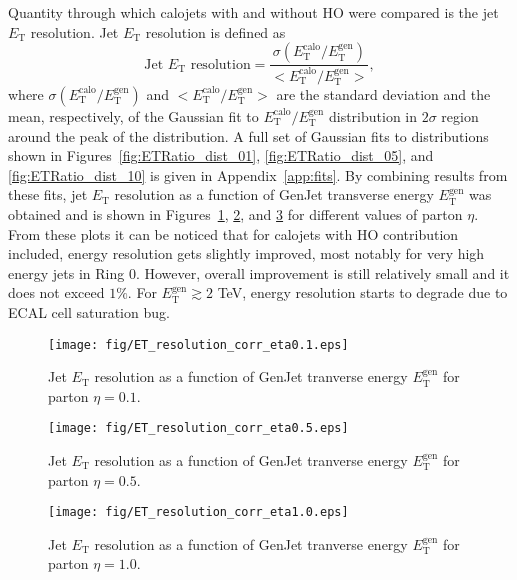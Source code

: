 \documentclass{cmspaper}
\begin{document}
Quantity through which calojets with and without HO were compared is the jet $E_\mathrm{T}$ resolution. Jet $E_\mathrm{T}$ resolution is defined as
\begin{equation}
 \text{Jet }E_\mathrm{T}\text{ resolution}=\frac{\sigma\left(E^\text{calo}_\mathrm{T}/E^\text{gen}_\mathrm{T} \right)}{<E^\text{calo}_\mathrm{T}/E^\text{gen}_\mathrm{T}>},
\end{equation} 
where $\sigma\left(E^\text{calo}_\mathrm{T}/E^\text{gen}_\mathrm{T} \right)$ and $<E^\text{calo}_\mathrm{T}/E^\text{gen}_\mathrm{T}>$ are the standard deviation and the mean, respectively, of the Gaussian fit to $E^\text{calo}_\mathrm{T}/E^\text{gen}_\mathrm{T}$ distribution in $2\sigma$ region around the peak of the distribution. A full set of Gaussian fits to distributions shown in Figures~\ref{fig:ETRatio_dist_01}, \ref{fig:ETRatio_dist_05}, and \ref{fig:ETRatio_dist_10} is given in Appendix~\ref{app:fits}. By combining results from these fits, jet $E_\mathrm{T}$ resolution as a function of GenJet transverse energy $E^\text{gen}_\mathrm{T}$ was obtained and is shown in Figures~\ref{fig:ET_res_01}, \ref{fig:ET_res_05}, and \ref{fig:ET_res_10} for different values of parton $\eta$. From these plots it can be noticed that for calojets with HO contribution included, energy resolution gets slightly improved, most notably for very high energy jets in Ring $0$. However, overall improvement is still relatively small and it does not exceed $1\%$. For $E^\text{gen}_\mathrm{T}\gtrsim2$ TeV, energy resolution starts to degrade due to ECAL cell saturation bug.
\begin{figure}
 \centering
 \texttt{[image: fig/ET\_resolution\_corr\_eta0.1.eps]}
 \caption{Jet $E_\mathrm{T}$ resolution as a function of GenJet tranverse energy $E^\text{gen}_\mathrm{T}$ for parton $\eta=0.1$.}
 \label{fig:ET_res_01}
\end{figure}

\begin{figure}
 \centering
 \texttt{[image: fig/ET\_resolution\_corr\_eta0.5.eps]}
 \caption{Jet $E_\mathrm{T}$ resolution as a function of GenJet tranverse energy $E^\text{gen}_\mathrm{T}$ for parton $\eta=0.5$.}
 \label{fig:ET_res_05}
\end{figure}

\begin{figure}
 \centering
 \texttt{[image: fig/ET\_resolution\_corr\_eta1.0.eps]}
 \caption{Jet $E_\mathrm{T}$ resolution as a function of GenJet tranverse energy $E^\text{gen}_\mathrm{T}$ for parton $\eta=1.0$.}
 \label{fig:ET_res_10}
\end{figure}
\end{document}
